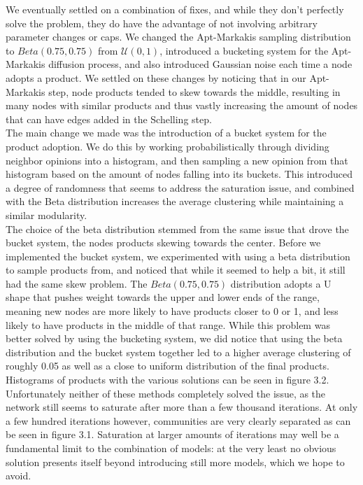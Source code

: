 \documentclass[12pt,twoside]{report}
\begin{document}
We eventually settled on a combination of fixes, and while they don't perfectly solve the problem, they do have the advantage of not involving arbitrary parameter changes or caps. We changed the Apt-Markakis sampling distribution to $Beta(0.75, 0.75)$  from $\mathcal{U}(0, 1)$, introduced a bucketing system for the Apt-Markakis diffusion process, and also introduced Gaussian noise each time a node adopts a product. We settled on these changes by noticing that in our Apt-Markakis step, node products tended to skew towards the middle, resulting in many nodes with similar products and thus vastly increasing the amount of nodes that can have edges added in the Schelling step. \\

The main change we made was the introduction of a bucket system for the product adoption. We do this by working probabilistically through dividing neighbor opinions into a histogram, and then sampling a new opinion from that histogram based on the amount of nodes falling into its buckets. This introduced a degree of randomness that seems to address the saturation issue, and combined with the Beta distribution increases the average clustering while maintaining a similar modularity. \\

The choice of the beta distribution stemmed from the same issue that drove the bucket system, the nodes products skewing towards the center. Before we implemented the bucket system, we experimented with using a beta distribution to sample products from, and noticed that while it seemed to help a bit, it still had the same skew problem. The $Beta(0.75, 0.75)$ distribution adopts a U shape that pushes weight towards the upper and lower ends of the range, meaning new nodes are more likely to have products closer to 0 or 1, and less likely to have products in the middle of that range. While this problem was better solved by using the bucketing system, we did notice that using the beta distribution and the bucket system together led to a higher average clustering of roughly 0.05 as well as a close to uniform distribution of the final products. Histograms of products with the various solutions can be seen in figure 3.2. \\

Unfortunately neither of these methods completely solved the issue, as the network still seems to saturate after more than a few thousand iterations. At only a few hundred iterations however, communities are very clearly separated as can be seen in figure 3.1. Saturation at larger amounts of iterations may well be a fundamental limit to the combination of models: at the very least no obvious solution presents itself beyond introducing still more models, which we hope to avoid. \\
\end{document}
